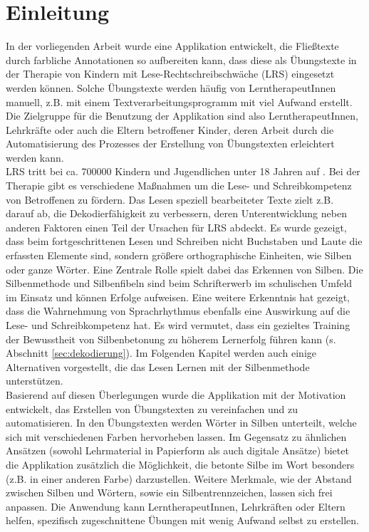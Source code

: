 
\chapter{Einleitung}

In der vorliegenden Arbeit wurde eine Applikation entwickelt, die Fließtexte durch farbliche Annotationen so aufbereiten kann, dass diese als Übungstexte in der Therapie von Kindern mit Lese-Rechtschreibschwäche (LRS) eingesetzt werden können. Solche Übungstexte werden häufig von LerntherapeutInnen manuell, z.B. mit einem Textverarbeitungsprogramm mit viel Aufwand erstellt. Die Zielgruppe für die Benutzung der Applikation sind also LerntherapeutInnen, Lehrkräfte oder auch die Eltern betroffener Kinder, deren Arbeit durch die Automatisierung des Prozesses der Erstellung von Übungstexten erleichtert werden kann.\\

LRS tritt bei ca. 700000 Kindern und Jugendlichen unter 18 Jahren auf \cite{Schulte-Koerne2014} . Bei der Therapie gibt es verschiedene Maßnahmen um die Lese- und Schreibkompetenz von Betroffenen zu fördern. Das Lesen speziell bearbeiteter Texte zielt z.B. darauf ab, die Dekodierfähigkeit zu verbessern, deren Unterentwicklung neben anderen Faktoren einen Teil der Ursachen für LRS abdeckt\cite{Schulte-Koerne2014}. Es wurde gezeigt, dass beim fortgeschrittenen Lesen und Schreiben nicht Buchstaben und Laute die erfassten Elemente sind, sondern größere orthographische Einheiten, wie Silben oder ganze Wörter\cite{Steinbrink2014}. Eine Zentrale Rolle spielt dabei das Erkennen von Silben. Die Silbenmethode und Silbenfibeln sind beim Schrifterwerb im schulischen Umfeld im Einsatz und können Erfolge aufweisen. Eine weitere Erkenntnis hat gezeigt, dass die Wahrnehmung von Sprachrhythmus ebenfalls eine Auswirkung auf die Lese- und Schreibkompetenz hat\cite{Brandelik2014}. Es wird vermutet, dass ein gezieltes Training der Bewusstheit von Silbenbetonung zu höherem Lernerfolg führen kann\cite{Holz2017} (s. Abschnitt \ref{sec:dekodierung}). Im Folgenden Kapitel werden auch einige Alternativen vorgestellt, die das Lesen Lernen mit der Silbenmethode unterstützen.\\
Basierend auf diesen Überlegungen wurde die Applikation mit der Motivation entwickelt, das Erstellen von Übungstexten zu vereinfachen und zu automatisieren. In den Übungstexten werden Wörter in Silben unterteilt, welche sich mit verschiedenen Farben hervorheben lassen. Im Gegensatz zu ähnlichen Ansätzen (sowohl Lehrmaterial in Papierform als auch digitale Ansätze) bietet die Applikation zusätzlich die Möglichkeit, die betonte Silbe im Wort besonders (z.B. in einer anderen Farbe) darzustellen. Weitere Merkmale, wie der Abstand zwischen Silben und Wörtern, sowie ein Silbentrennzeichen, lassen sich frei anpassen. Die Anwendung kann LerntherapeutInnen, Lehrkräften oder Eltern helfen, spezifisch zugeschnittene Übungen mit wenig Aufwand selbst zu erstellen.\\

